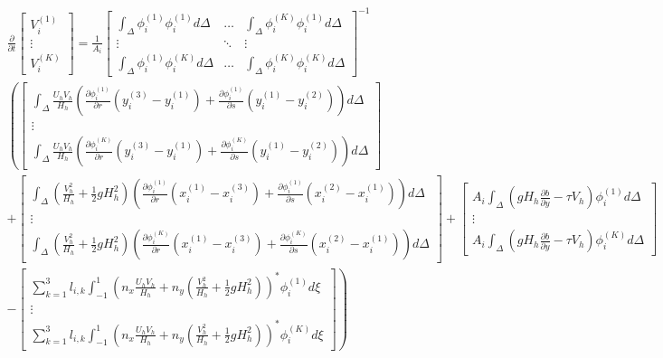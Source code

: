 \documentclass[11pt]{article}
\begin{document}
{\tiny
\begin{multline}
\frac{\partial}{\partial t} \begin{bmatrix} V_i^{(1)} \\[5pt] \vdots \\[5pt] V_i^{(K)}  \end{bmatrix} =\frac{1}{A_i}\begin{bmatrix}\displaystyle\int_{\Delta}\phi_i^{(1)}\phi_i^{(1)}d\Delta & \hdots & \displaystyle\int_{\Delta}\phi_i^{(K)}\phi_i^{(1)}d\Delta \\[5pt] \vdots & \ddots & \vdots \\[5pt]  \displaystyle\int_{\Delta}\phi_i^{(1)}\phi_i^{(K)}d\Delta & \hdots & \displaystyle\int_{\Delta}\phi_i^{(K)}\phi_i^{(K)}d\Delta\end{bmatrix}^{-1}  \\ \left( \begin{bmatrix}\displaystyle\int_{\Delta}\frac{U_hV_h}{H_h}\left(\frac{\partial \phi_i^{(1)}}{\partial r}\left(y_i^{(3)}-y_i^{(1)}\right) + \frac{\partial \phi_i^{(1)}}{\partial s}\left(y_i^{(1)}-y_i^{(2)}\right) \right)d\Delta     \\ \vdots \\ \displaystyle\int_{\Delta}\frac{U_hV_h}{H_h}\left(\frac{\partial \phi_i^{(K)}}{\partial r}\left(y_i^{(3)}-y_i^{(1)}\right) + \frac{\partial \phi_i^{(K)}}{\partial s}\left(y_i^{(1)}-y_i^{(2)}\right) \right) d\Delta \end{bmatrix} \right.\\ + \left. \begin{bmatrix}  \displaystyle\int_{\Delta}\left(\frac{V_h^2}{H_h} + \frac{1}{2}gH_h^2\right)\left(\frac{\partial \phi_i^{(1)}}{\partial r}\left(x_i^{(1)}-x_i^{(3)}\right) + \frac{\partial \phi_i^{(1)}}{\partial s}\left(x_i^{(2)}-x_i^{(1)}\right) \right)d\Delta \\ \vdots \\ \displaystyle\int_{\Delta}\left(\frac{V_h^2}{H_h} + \frac{1}{2}gH_h^2\right)\left(\frac{\partial \phi_i^{(K)}}{\partial r}\left(x_i^{(1)}-x_i^{(3)}\right) + \frac{\partial \phi_i^{(K)}}{\partial s}\left(x_i^{(2)}-x_i^{(1)}\right) \right) d\Delta \end{bmatrix} + \begin{bmatrix}A_i \displaystyle\int_{\Delta}\left( gH_h\frac{\partial b}{\partial y} - \tau V_h \right)\phi_i^{(1)} d\Delta  \\ \vdots \\  A_i\displaystyle\int_{\Delta}\left( gH_h\frac{\partial b}{\partial y} - \tau V_h \right)\phi_i^{(K)} d\Delta  \end{bmatrix} \right. \\ \left. -\begin{bmatrix}\displaystyle\sum_{k=1}^3 l_{i,k}\int_{-1}^1 \left(n_x\frac{U_hV_h}{H_h} + n_y\left(\frac{V_h^2}{H_h} + \frac{1}{2}gH_h^2\right)\right)^*\phi_i^{(1)} d\xi \\ \vdots \\ \displaystyle\sum_{k=1}^3 l_{i,k}\int_{-1}^1 \left(n_x\frac{U_hV_h}{H_h} + n_y\left(\frac{V_h^2}{H_h} + \frac{1}{2}gH_h^2\right)\right)^*\phi_i^{(K)} d\xi \end{bmatrix} \right) 
\end{multline}}
\end{document}
